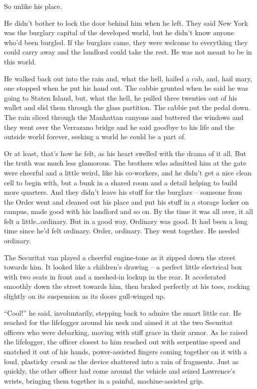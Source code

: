 So unlike his place.

He didn't bother to lock the door behind him when he left. They said 
New York was the burglary capital of the developed world, but he didn't 
know anyone who'd been burgled. If the burglars came, they were welcome 
to everything they could carry away and the landlord could take the 
rest. He was not meant to be in this world.

He walked back out into the rain and, what the hell, hailed a cab, and, 
hail mary, one stopped when he put his hand out. The cabbie grunted 
when he said he was going to Staten Island, but, what the hell, he 
pulled three twenties out of his wallet and slid them through the glass 
partition. The cabbie put the pedal down. The rain sliced through the 
Manhattan canyons and battered the windows and they went over the 
Verrazano bridge and he said goodbye to his life and the outside world 
forever, seeking a world he could be a part of.

Or at least, that's how he felt, as his heart swelled with the drama of 
it all. But the truth was much less glamorous. The brothers who 
admitted him at the gate were cheerful and a little weird, like his 
co-workers, and he didn't get a nice clean cell to begin with, but a 
bunk in a shared room and a detail helping to build more quarters. And 
they didn't leave his stuff for the burglars -- someone from the Order 
went and cleaned out his place and put his stuff in a storage locker on 
campus, made good with his landlord and so on. By the time it was all 
over, it all felt a little\ldots{}ordinary. But in a good way, Ordinary was 
good. It had been a long time since he'd felt ordinary. Order, 
ordinary. They went together. He needed ordinary.

\tb

The Securitat van played a cheerful engine-tone as it zipped down the 
street towards him. It looked like a children's drawing -- a perfect 
little electrical box with two seats in front and a meshed-in lockup in 
the rear. It accelerated smoothly down the street towards him, then 
braked perfectly at his toes, rocking slightly on its suspension as its 
doors gull-winged up.

“Cool!” he said, involuntarily, stepping back to admire the smart 
little car. He reached for the lifelogger around his neck and aimed it 
at the two Securitat officers who were debarking, moving with stiff 
grace in their armor. As he raised the lifelogger, the officer closest 
to him reached out with serpentine speed and snatched it out of his 
hands, power-assisted fingers coming together on it with a loud, 
plasticky \emph{crunk} as the device shattered into a rain of 
fragments. Just as quickly, the other officer had come around the 
vehicle and seized Lawrence's wrists, bringing them together in a 
painful, machine-assisted grip.

